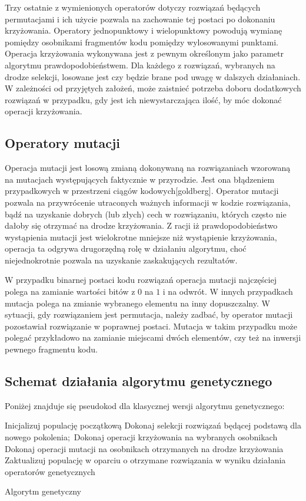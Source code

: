 Trzy ostatnie z wymienionych operatorów dotyczy rozwiązań będących permutacjami i ich użycie pozwala na zachowanie tej postaci po dokonaniu krzyżowania. Operatory jednopunktowy i wielopunktowy powodują wymianę pomiędzy osobnikami fragmentów kodu pomiędzy wylosowanymi punktami. Operacja krzyżowania wykonywana jest z pewnym określonym jako parametr algorytmu prawdopodobieństwem. Dla każdego z rozwiązań, wybranych na drodze selekcji, losowane jest czy będzie brane pod uwagę w dalszych działaniach. W zależności od przyjętych założeń, może zaistnieć potrzeba doboru dodatkowych rozwiązań w przypadku, gdy jest ich niewystarczająca ilość, by móc dokonać operacji krzyżowania.

\subsection{Operatory mutacji}
Operacja mutacji jest losową zmianą dokonywaną na rozwiązaniach wzorowaną na mutacjach występujących faktycznie w przyrodzie. Jest ona błądzeniem przypadkowych w przestrzeni ciągów kodowych[goldberg]. Operator mutacji pozwala na przywrócenie utraconych ważnych informacji w kodzie rozwiązania, bądź na uzyskanie dobrych (lub złych) cech w rozwiązaniu, których często nie dałoby się otrzymać na drodze krzyżowania. Z racji iż prawdopodobieństwo wystąpienia mutacji jest wielokrotne mniejsze niż wystąpienie krzyżowania, operacja ta odgrywa drugorzędną rolę w działaniu algorytmu, choć niejednokrotnie pozwala na uzyskanie zaskakujących rezultatów.

W przypadku binarnej postaci kodu rozwiązań operacja mutacji najczęściej polega na zamianie wartości bitów z $0$ na $1$ i na odwrót. W innych przypadkach mutacja polega na zmianie wybranego elementu na inny dopuszczalny. W sytuacji, gdy rozwiązaniem jest permutacja, należy zadbać, by operator mutacji pozostawiał rozwiązanie w poprawnej postaci. Mutacja w takim przypadku może polegać przykładowo na zamianie miejscami dwóch elementów, czy też na inwersji pewnego fragmentu kodu. 

\subsection{Schemat działania algorytmu genetycznego}
Poniżej znajduje się pseudokod dla klasycznej wersji algorytmu genetycznego:
\begin{algorithm}[H]
	Inicjalizuj populację początkową\;
 	{
 		Dokonaj selekcji rozwiązań będącej podstawą dla nowego pokolenia;\
 		Dokonaj operacji krzyżowania na wybranych osobnikach\;
 		Dokonaj operacji mutacji na osobnikach otrzymanych na drodze krzyżowania\;
 		Zaktualizuj populację w oparciu o otrzymane rozwiązania w wyniku działania operatorów genetycznych
 	}
 	\caption{Algorytm genetyczny}
\end{algorithm}
